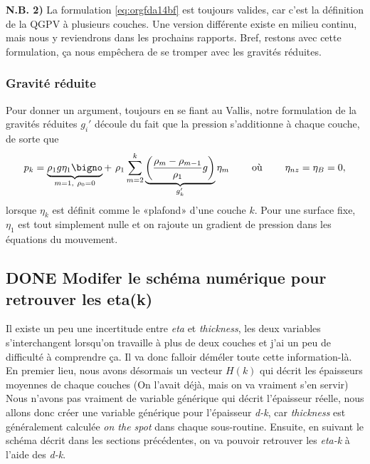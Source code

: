 \documentclass[10pt]{article}
\numberwithin{equation}{section}
\begin{document}
\textbf{N.B. 2)} La formulation \ref{eq:orgfda14bf} est toujours valides, car c'est la définition de la QGPV à plusieurs couches.
Une version différente existe en milieu continu, mais nous y reviendrons dans les prochains rapports.
Bref, restons avec cette formulation, ça nous empêchera de se tromper avec les gravités réduites.

\subsubsection{Gravité réduite}
\label{sec:org84a00f5}

Pour donner un argument, toujours en se fiant au Vallis, notre formulation de la gravités réduites \(g_i'\) découle du fait que la pression s'additionne à chaque couche, de sorte que 
\begin{equation}
p_{k} = \underbrace{\rho_1 g \eta_1\bigno}_{m=1,\ \rho_0=0} + \ \rho_1 \sum_{m=2}^k \underbrace{\qty(\frac{\rho_m - \rho_{m-1}}{\rho_1} g)}_{g_k'} \eta_m
\hspace{0.8cm} \text{où}\hspace{0.8cm}
\eta_{nz} = \eta_B = 0,
\end{equation}
lorsque \(\eta_k\) est définit comme le «plafond» d'une couche \(k\).
Pour une surface fixe, \(\eta_1\) est tout simplement nulle et on rajoute un gradient de pression dans les équations du mouvement.

\subsection{{\bfseries\sffamily DONE} Modifer le schéma numérique pour retrouver les eta(k)}
\label{sec:org3c00385}
Il existe un peu une incertitude entre \emph{eta} et \emph{thickness}, les deux variables s'interchangent lorsqu'on travaille à plus de deux couches et j'ai un peu de difficulté à comprendre ça.
Il va donc falloir déméler toute cette information-là.
En premier lieu, nous avons désormais un vecteur \(H(k)\) qui décrit les épaisseurs moyennes de chaque couches (On l'avait déjà, mais on va vraiment s'en servir)
Nous n'avons pas vraiment de variable générique qui décrit l'épaisseur réelle, nous allons donc créer une variable générique pour l'épaisseur \emph{d-k}, car \emph{thickness} est généralement calculée \emph{on the spot} dans chaque sous-routine.
Ensuite, en suivant le schéma décrit dans les sections précédentes, on va pouvoir retrouver les \emph{eta-k} à l'aide des \emph{d-k}.\\[0pt]
\end{document}
